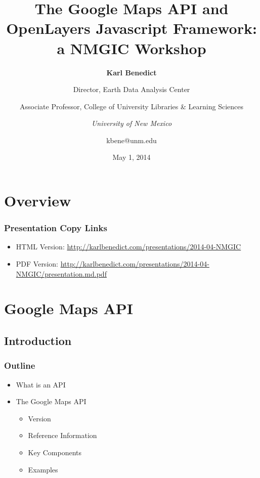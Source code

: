 \documentclass[]{article}
\title{The Google Maps API and OpenLayers Javascript Framework: a NMGIC
Workshop}
\author{\textbf{Karl Benedict} \and Director, Earth Data Analysis Center \and Associate Professor, College of University Libraries \& Learning
Sciences \and \emph{University of New Mexico} \and kbene@unm.edu}
\date{May 1, 2014}
\begin{document}
\maketitle

{
\hypersetup{linkcolor=black}
\setcounter{tocdepth}{3}
\tableofcontents
}
\section{Overview}\label{overview}

\subsubsection{Presentation Copy Links}\label{presentation-copy-links}

\begin{itemize}
\itemsep1pt\parskip0pt
\item
  HTML Version:
  \url{http://karlbenedict.com/presentations/2014-04-NMGIC}
\item
  PDF Version:
  \url{http://karlbenedict.com/presentations/2014-04-NMGIC/presentation.md.pdf}
\end{itemize}

\section{Google Maps API}\label{google-maps-api}

\subsection{Introduction}\label{introduction}

\subsubsection{Outline}\label{outline}

\begin{itemize}
\itemsep1pt\parskip0pt
\item
  What is an API
\item
  The Google Maps API

  \begin{itemize}
  \itemsep1pt\parskip0pt
  \item
    Version
  \item
    Reference Information
  \item
    Key Components
  \item
    Examples
  \end{itemize}
\end{itemize}
\end{document}
